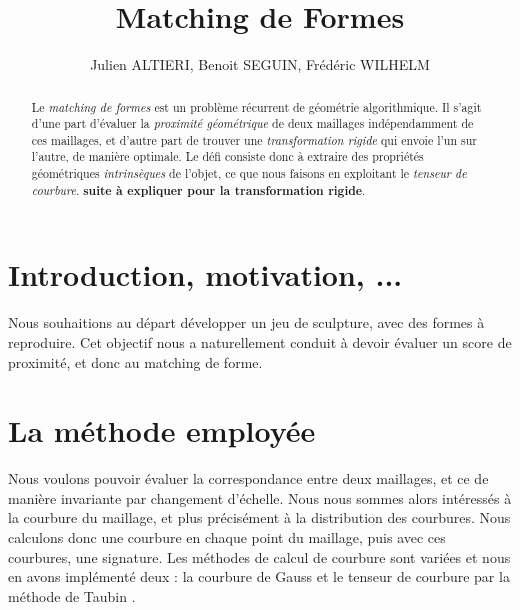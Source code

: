 \documentclass{llncs}
\begin{document}
\title{Matching de Formes}

\author{Julien ALTIERI, Benoit SEGUIN, Frédéric WILHELM}

\maketitle

\begin{abstract}
Le \textit{matching de formes} est un probl\`eme r\'ecurrent de g\'eom\'etrie algorithmique. Il s'agit d'une part d'\'evaluer la \textit{proximit\'e g\'eom\'etrique} de deux maillages ind\'ependamment de ces maillages, et d'autre part de trouver une \textit{transformation rigide} qui envoie l'un sur l'autre, de mani\`ere optimale. Le d\'efi consiste donc à extraire des propri\'et\'es g\'eom\'etriques \textit{intrins\`eques} de l'objet, ce que nous faisons en exploitant le \textit{tenseur de courbure}. \textbf{suite \`a expliquer pour la transformation rigide}.
\end{abstract}

\section{Introduction, motivation, ...}
Nous souhaitions au d\'epart d\'evelopper un jeu de sculpture, avec des formes \`a reproduire. Cet objectif nous a naturellement conduit \`a devoir \'evaluer un score de proximit\'e, et donc au matching de forme.


\section{La m\'ethode employ\'ee}

Nous voulons pouvoir évaluer la correspondance entre deux maillages, et ce de manière invariante par changement d'échelle. Nous nous sommes alors intéressés à la courbure du maillage, et plus précisément à la distribution des courbures. Nous calculons donc une courbure en chaque point du maillage, puis avec ces courbures, une signature. Les méthodes de calcul de courbure sont variées et nous en avons implémenté deux : la courbure de Gauss \cite{rugis} et le tenseur de courbure par la méthode de Taubin \cite{taubin}.
\end{document}
